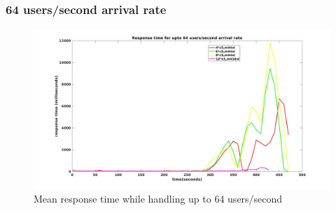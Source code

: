 \begin{frame}
\frametitle{64 users/second arrival rate}
\begin{figure}[h]
	\centering
	\includegraphics[width=1\textwidth, height=0.5\textheight]{images/scale64.jpg}
	\caption{Mean response time while handling up to 64 users/second}\label{fig:sqlopt}
\end{figure}
\end{frame}
